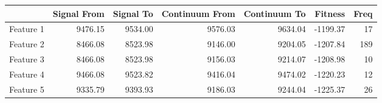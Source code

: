 {{{{\begin{table}
\begin{center}
\begin{tabular}{rrrrrrr}
  \hline
 & Signal From & Signal To & Continuum From & Continuum To & Fitness & Freq \\ 
  \hline
Feature 1 & 9476.15 & 9534.00 & 9576.03 & 9634.04 & -1199.37 &  17 \\ 
  Feature 2 & 8466.08 & 8523.98 & 9146.00 & 9204.05 & -1207.84 & 189 \\ 
  Feature 3 & 8466.08 & 8523.98 & 9156.03 & 9214.07 & -1208.98 &  10 \\ 
  Feature 4 & 9466.08 & 9523.82 & 9416.04 & 9474.02 & -1220.23 &  12 \\ 
  Feature 5 & 9335.79 & 9393.93 & 9186.03 & 9244.04 & -1225.37 &  26 \\ 

\end{tabular}
\end{center}
\end{table}}}}}
